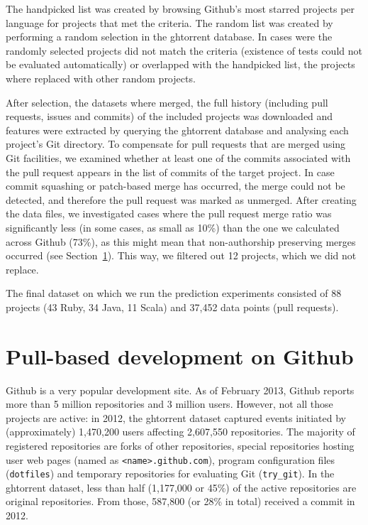 \documentclass{acm_proc_article-sp}
\begin{document}
The \textsf{handpicked} list was created by browsing Github's most starred projects
per language for projects that met the criteria. The \textsf{random} list
was created by performing a random selection in the {\sc ght}orrent database. In
cases were the randomly selected projects did not match the criteria (existence
of tests could not be evaluated automatically) or overlapped with the
\textsf{handpicked} list, the projects where replaced with
other random projects. 

After selection, the datasets where merged, the full history (including pull
requests, issues and commits) of the included projects was downloaded and
features were extracted by querying the {\sc ght}orrent database and analysing
each project's Git directory.
To compensate for pull requests that are merged
using Git facilities, we examined whether at least one of the commits associated
with the pull request appears in the list of commits of the target project. In
case commit squashing or patch-based merge has occurred, the merge could not be
detected, and therefore the pull request was marked as unmerged.
After creating the data files, we investigated
cases where the pull request merge ratio was significantly less (in some cases,
as small as 10\%) than the one we calculated across Github (73\%), as this might
mean that non-authorship preserving merges occurred (see Section~\ref{sec:github}). This way, we filtered out 12 projects, which we did not replace. 

The final dataset on which we run the prediction experiments consisted of 88
projects (43 Ruby, 34 Java, 11 Scala) and 37,452 data points (pull requests).
%

\section{Pull-based development on Github}
\label{sec:github}

Github is a very popular development site. As of February 2013, Github reports
more than 5 million repositories and 3 million users. However, not all those
projects are active: in 2012, the {\sc ght}orrent dataset captured events initiated by
(approximately) 1,470,200 users affecting 2,607,550 repositories. The majority
of registered repositories are forks of other repositories, special repositories
hosting user web pages (named as \texttt{<name>.github.com}), program
configuration files (\texttt{dotfiles}) and temporary repositories for
evaluating Git (\texttt{try\_git}). In the {\sc ght}orrent dataset, less than half
(1,177,000 or 45\%) of the active repositories are original repositories. From
those, 587,800 (or 28\% in total) received a commit in 2012.
\end{document}
